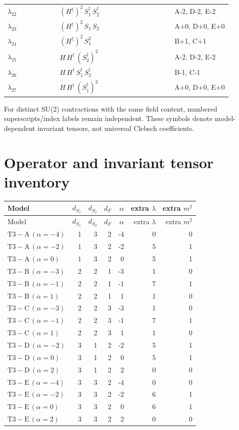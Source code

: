 \documentclass[9pt,a4paper]{article}
\begin{document}
\begin{longtable}{@{}p{0.21\linewidth}p{0.46\linewidth}p{0.23\linewidth}@{}}
$\lambda_{22}$ & $\left(H^\dagger\right)^{2}\, S_1^\dagger\, S_2^\dagger$ & A-2, D-2, E-2 \\
$\lambda_{23}$ & $\left(H^\dagger\right)^{2}\, S_1\, S_2$ & A+0, D+0, E+0 \\
$\lambda_{24}$ & $\left(H^\dagger\right)^{2}\, S_1^{2}$ & B+1, C+1 \\
$\lambda_{25}$ & $H\, H^\dagger\, \left(S_2^\dagger\right)^{2}$ & A-2, D-2, E-2 \\
$\lambda_{26}$ & $H\, H^\dagger\, S_1^\dagger\, S_2^\dagger$ & B-1, C-1 \\
$\lambda_{27}$ & $H\, H^\dagger\, \left(S_1^\dagger\right)^{2}$ & A+0, D+0, E+0 \\
\bottomrule
\end{longtable}
For distinct SU(2) contractions with the same field content, numbered superscripts/index labels remain independent. These symbols denote model-dependent invariant tensors, not universal Clebsch coefficients.
\section*{Operator and invariant tensor inventory}
\begin{longtable}{@{}lrrrrrr@{}}
\toprule
Model & $d_{S_1}$ & $d_{S_2}$ & $d_F$ & $\alpha$ & extra $\lambda$ & extra $m^2$\\
\midrule
\endfirsthead
\toprule
Model & $d_{S_1}$ & $d_{S_2}$ & $d_F$ & $\alpha$ & extra $\lambda$ & extra $m^2$\\
\midrule
\endhead
$\mathrm{T3-A}\,(\alpha=-4)$ & 1 & 3 & 2 & -4 & 0 & 0 \\
$\mathrm{T3-A}\,(\alpha=-2)$ & 1 & 3 & 2 & -2 & 5 & 1 \\
$\mathrm{T3-A}\,(\alpha=0)$ & 1 & 3 & 2 & 0 & 5 & 1 \\
$\mathrm{T3-B}\,(\alpha=-3)$ & 2 & 2 & 1 & -3 & 1 & 0 \\
$\mathrm{T3-B}\,(\alpha=-1)$ & 2 & 2 & 1 & -1 & 7 & 1 \\
$\mathrm{T3-B}\,(\alpha=1)$ & 2 & 2 & 1 & 1 & 1 & 0 \\
$\mathrm{T3-C}\,(\alpha=-3)$ & 2 & 2 & 3 & -3 & 1 & 0 \\
$\mathrm{T3-C}\,(\alpha=-1)$ & 2 & 2 & 3 & -1 & 7 & 1 \\
$\mathrm{T3-C}\,(\alpha=1)$ & 2 & 2 & 3 & 1 & 1 & 0 \\
$\mathrm{T3-D}\,(\alpha=-2)$ & 3 & 1 & 2 & -2 & 5 & 1 \\
$\mathrm{T3-D}\,(\alpha=0)$ & 3 & 1 & 2 & 0 & 5 & 1 \\
$\mathrm{T3-D}\,(\alpha=2)$ & 3 & 1 & 2 & 2 & 0 & 0 \\
$\mathrm{T3-E}\,(\alpha=-4)$ & 3 & 3 & 2 & -4 & 0 & 0 \\
$\mathrm{T3-E}\,(\alpha=-2)$ & 3 & 3 & 2 & -2 & 6 & 1 \\
$\mathrm{T3-E}\,(\alpha=0)$ & 3 & 3 & 2 & 0 & 6 & 1 \\
$\mathrm{T3-E}\,(\alpha=2)$ & 3 & 3 & 2 & 2 & 0 & 0 \\
\bottomrule
\end{longtable}
\end{document}
